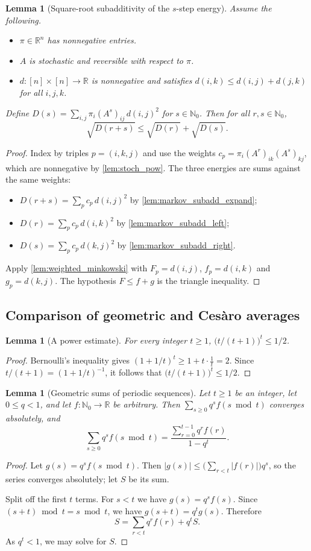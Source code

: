 \documentclass[11pt]{article}
\newtheorem{lemma}[theorem]{Lemma}
\theoremstyle{definition}
\theoremstyle{remark}
\newcommand{\R}{\mathbb{R}}
\newcommand{\Nz}{\mathbb{N}_0}
\begin{document}
\begin{lemma}[Square-root subadditivity of the $s$-step energy]\label{lem:markov_subadd}
Assume the following.
\begin{itemize}
\item $\pi\in\R^n$ has nonnegative entries.
\item $A$ is stochastic and reversible with respect to $\pi$.
\item $d:[n]\times[n]\to\R$ is nonnegative and satisfies $d(i,k)\le d(i,j)+d(j,k)$ for all $i,j,k$.
\end{itemize}
Define $D(s)=\sum_{i,j}\pi_i(A^s)_{ij}\,d(i,j)^2$ for $s\in\Nz$. Then for all $r,s\in\Nz$,
\[
\sqrt{D(r+s)}\le\sqrt{D(r)}+\sqrt{D(s)}.
\]
\end{lemma}
\begin{proof}
Index by triples $p=(i,k,j)$ and use the weights $c_p=\pi_i(A^r)_{ik}(A^s)_{kj}$, which are nonnegative by \cref{lem:stoch_pow}. The three energies are sums against the same weights:
\begin{itemize}
\item $D(r+s)=\sum_pc_p\,d(i,j)^2$ by \cref{lem:markov_subadd_expand};
\item $D(r)=\sum_pc_p\,d(i,k)^2$ by \cref{lem:markov_subadd_left};
\item $D(s)=\sum_pc_p\,d(k,j)^2$ by \cref{lem:markov_subadd_right}.
\end{itemize}
Apply \cref{lem:weighted_minkowski} with $F_p=d(i,j)$, $f_p=d(i,k)$ and $g_p=d(k,j)$. The hypothesis $F\le f+g$ is the triangle inequality.
\end{proof}

\subsection{Comparison of geometric and Ces\`aro averages}

\begin{lemma}[A power estimate]\label{lem:comp_geom_mod_pow_le}
For every integer $t\ge1$, $\bigl(t/(t+1)\bigr)^t\le 1/2$.
\end{lemma}
\begin{proof}
Bernoulli's inequality gives $(1+1/t)^t\ge1+t\cdot\frac1t=2$. Since $t/(t+1)=(1+1/t)^{-1}$, it follows that $\bigl(t/(t+1)\bigr)^t\le 1/2$.
\end{proof}

\begin{lemma}[Geometric sums of periodic sequences]\label{lem:comp_geom_mod_hasSum}
Let $t\ge1$ be an integer, let $0\le q<1$, and let $f:\Nz\to\R$ be arbitrary. Then $\sum_{s\ge0}q^sf(s\bmod t)$ converges absolutely, and
\[
\sum_{s\ge0}q^sf(s\bmod t)=\frac{\sum_{r=0}^{t-1}q^rf(r)}{1-q^t}.
\]
\end{lemma}
\begin{proof}
Let $g(s)=q^sf(s\bmod t)$. Then $|g(s)|\le\bigl(\sum_{r<t}|f(r)|\bigr)q^s$, so the series converges absolutely; let $S$ be its sum.

Split off the first $t$ terms. For $s<t$ we have $g(s)=q^sf(s)$. Since $(s+t)\bmod t=s\bmod t$, we have $g(s+t)=q^tg(s)$. Therefore
\[
S=\sum_{r<t}q^rf(r)+q^tS .
\]
As $q^t<1$, we may solve for $S$.
\end{proof}
\end{document}
